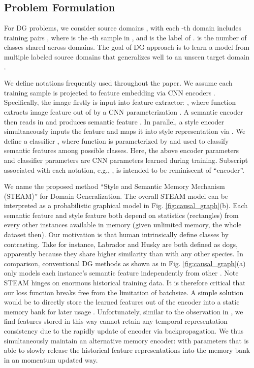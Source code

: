 \documentclass[10pt,twocolumn,letterpaper]{article}
\newcommand{\0}{{\bf 0}}
\begin{document}
\subsection{Problem Formulation} \label{sec:probform}
For DG problems, we consider  source domains , with each -th domain  includes  training pairs , where  is the -th sample in , and  is the label of .  is the number of classes shared across domains. The goal of DG approach is to learn a model from multiple labeled source domains that generalizes well to an unseen target domain .

We define notations frequently used throughout the paper. We assume each training sample is projected to feature embedding via CNN encoders \cite{he2016deep, li2021contextual}. Specifically, the image  firstly is input into feature extractor: , where function  extracts image feature  out of  by a CNN parameterization . A semantic encoder  then reads in  and produces semantic feature . In parallel, a style encoder simultaneously inputs the  feature and maps it into style representation via . We define a classifier , where function  is parameterized by  and used to classify semantic features among  possible classes. Here, the above encoder parameters  and classifier parameters  are CNN parameters learned during training. Subscript  associated with each notation, e.g.,  , is intended to be reminiscent of ``encoder''.

We name the proposed method ``Style and Semantic Memory Mechanism (STEAM)'' for Domain Generalization. The overall STEAM model can be interpreted as a probabilistic graphical model in Fig. \ref{fig:causal_graph}(b). Each semantic feature  and style feature  both depend on statistics (rectangles) from every other instances available in memory (given unlimited memory, the whole dataset then). Our motivation is that human intrinsically define classes by contrasting. Take for instance, Labrador and Husky are both defined as dogs, apparently because they share higher similarity than with any other species. In comparison, conventional DG methods as shown as in Fig. \ref{fig:causal_graph}(a) only models each instance's semantic feature  independently from other . Note STEAM hinges on enormous historical training data. It is therefore critical that our loss function breaks free from the limitation of batchsize. A simple solution would be to directly store the learned features out of the encoder into a static memory bank for later usage \cite{wu2018unsupervised}. Unfortunately, similar to the observation in \cite{he2020momentum}, we find features stored in this way cannot retain any temporal representation consistency due to the rapidly update of encoder via backpropagation. We thus simultaneously maintain an alternative memory encoder:  with parameters  that is able to slowly release the historical feature representations into the memory bank in an momentum updated way.
\end{document}
